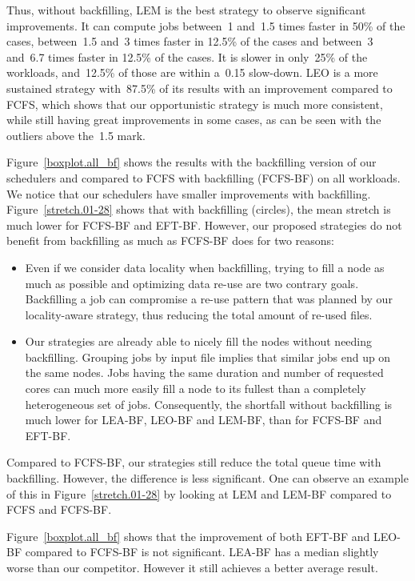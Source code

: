 \documentclass[conference,10pt]{IEEEtran}
\begin{document}
Thus, without backfilling, LEM is the best strategy to observe significant improvements.
It can compute jobs between~1 and~1.5 times faster in 50\% of the cases,
between~1.5 and~3 times faster in 12.5\% of the cases and between~3 and~6.7 times faster in 12.5\% of the cases.
It is slower in only~25\% of the workloads, and~12.5\% of those are within a~0.15 slow-down.
LEO is a more sustained strategy with~87.5\% of its results with an improvement compared to FCFS, which shows that our opportunistic
strategy is much more consistent, while still having great improvements in some cases, as can be seen with the outliers above the~1.5 mark.

Figure~\ref{boxplot.all_bf} shows the results with the backfilling version of our
schedulers and compared to FCFS with backfilling (FCFS-BF) on all workloads.
We  notice that our schedulers  have smaller improvements with backfilling.
Figure~\ref{stretch.01-28} shows that
with backfilling 
(circles),
the mean stretch is much lower for FCFS-BF and EFT-BF. 
However, our proposed strategies do not benefit from backfilling as much as FCFS-BF does for two reasons:
\begin{itemize}
	\item Even if we consider data locality when backfilling, trying to fill a node as much as possible and optimizing data re-use are two contrary goals. 
	Backfilling a job can compromise a re-use pattern that was planned by our locality-aware strategy, thus reducing the total 
	amount of re-used files.
	\item Our strategies are already able to nicely fill the nodes without needing backfilling.
	Grouping jobs by input file implies that similar jobs end up on the same nodes.
	Jobs having the same duration and number of requested cores can much more easily fill a node to its fullest than a completely heterogeneous set of jobs.
	Consequently, the shortfall without backfilling is much lower for LEA-BF, LEO-BF and LEM-BF, than for FCFS-BF and EFT-BF.
\end{itemize}
Compared to FCFS-BF, our strategies still reduce the total queue time with backfilling.
However, the difference is less significant. One can observe an example of this
in Figure~\ref{stretch.01-28} by looking at LEM and LEM-BF compared to FCFS and FCFS-BF.

Figure~\ref{boxplot.all_bf} shows that the improvement of both EFT-BF and LEO-BF compared to FCFS-BF is not significant.
LEA-BF has a median slightly worse than our competitor. However it still achieves a better average result.
\end{document}
